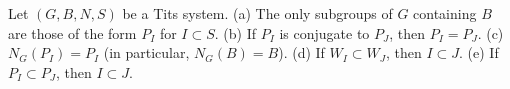 Let $(G, B, N, S)$ be a Tits system.
(a) The only subgroups of $G$ containing $B$ are those of the form $P_I$ for $I \subset S$.
(b) If $P_I$ is conjugate to $P_J$, then $P_I = P_J$.
(c) $N_G(P_I) = P_I$ (in particular, $N_G(B) = B$).
(d) If $W_I \subset W_J$, then $I \subset J$.
(e) If $P_I \subset P_J$, then $I \subset J$.
